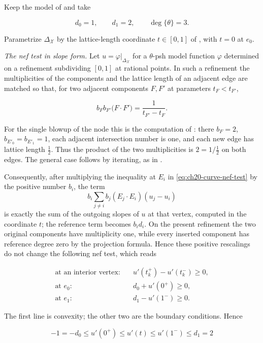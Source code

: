 \begin{example}
\label{ex:ch22-modulus-segment}
Keep the model of  and take

\[
              d_0=1,\qquad d_1=2,\qquad \deg\{\theta\}=3 .
\]

Parametrize $\Delta_{\mathcal X}$ by the lattice-length coordinate
$t\in[0,1]$ of , with $t=0$ at
$e_0$.

\emph{The nef test in slope form.}  Let $u=\varphi|_{\Delta_{\mathcal X}}$
for a $\theta$-psh model function $\varphi$ determined on a refinement
subdividing $[0,1]$ at rational points.  In such a refinement the
multiplicities of the components and the lattice length of an adjacent edge
are matched so that, for two adjacent components $F,F'$ at parameters
$t_F<t_{F'}$,

\[
 b_Fb_{F'}\bigl(F\cdot F'\bigr)=\frac1{t_{F'}-t_F} .
\]

For the single blowup of the node this is the computation of
: there $b_F=2$,
$b_{E'_0}=b_{E'_1}=1$, each adjacent intersection number is one, and
each new edge has lattice length $\tfrac12$.  Thus the product of the two
multiplicities is $2=1/\tfrac12$ on both edges.  The general case follows
by iterating, as in .

Consequently, after multiplying the inequality at $E_i$ in
\eqref{eq:ch20-curve-nef-test} by the positive number $b_i$, the term
\[
 b_i\sum_{j\neq i}b_j(E_j\cdot E_i)(u_j-u_i)
\]
is exactly the sum of the outgoing slopes of $u$ at that vertex, computed
in the coordinate $t$; the reference term becomes $b_id_i$.  On the
present refinement the two original components have multiplicity one, while
every inserted component has reference degree zero by the projection
formula.  Hence these positive rescalings do not change the following nef
test, which reads

\[
 \begin{aligned}
 \text{at an interior vertex:}&\quad
   u'(t_k^+)-u'(t_k^-)\geq0,\\
 \text{at }e_0:&\quad d_0+u'(0^+)\geq0,\\
 \text{at }e_1:&\quad d_1-u'(1^-)\geq0 .
 \end{aligned}
\tag{22.56}\label{eq:ch22-curve-slope-form}
\]

The first line is convexity; the other two are the boundary conditions.
Hence

\[
 -1=-d_0\leq u'(0^+)\leq u'(t)\leq u'(1^-)\leq d_1=2
\]


\end{example}
